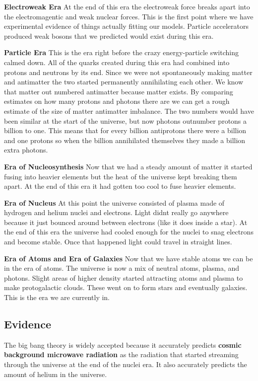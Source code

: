 \textbf{Electroweak Era}
At the end of this era the electroweak force breaks apart into the electromagentic and weak nuclear forces. This is the first point where we have experimental evidence of things actually fitting our models. Particle accelerators produced weak bosons that we predicted would exist during this era.

\textbf{Particle Era}
This is the era right before the crazy energy-particle switching calmed down. All of the quarks created during this era had combined into protons and neutrons by its end. Since we were not spontaneously making matter and antimatter the two started permanently annihilating each other. We know that matter out numbered antimatter because matter exists. By comparing estimates on how many protons and photons there are we can get a rough estimate of the size of matter antimatter imbalance. The two numbers would have been similar at the start of the universe, but now photons outnumber protons a billion to one. This means that for every billion antiprotons there were a billion and one protons so when the billion annihilated themselves they made a billion extra photons.

\textbf{Era of Nucleosynthesis}
Now that we had a steady amount of matter it started fusing into heavier elements but the heat of the universe kept breaking them apart. At the end of this era it had gotten too cool to fuse heavier elements.

\textbf{Era of Nucleus}
At this point the universe consisted of plasma made of hydrogen and helium nuclei and electrons. Light didnt really go anywhere because it just bounced around between electrons (like it does inside a star). At the end of this era the universe had cooled enough for the nuclei to snag electrons and become stable. Once that happened light could travel in straight lines.

\textbf{Era of Atoms and Era of Galaxies}
Now that we have stable atoms we can be in the era of atoms. The universe is now a mix of neutral atoms, plasma, and photons. Slight areas of higher density started attracting atoms and plasma to make protogalactic clouds. These went on to form stars and eventually galaxies. This is the era we are currently in.

\subsection{Evidence}
The big bang theory is widely accepted because it accurately predicts \textbf{cosmic background microwave radiation} as the radiation that started streaming through the universe at the end of the nuclei era. It also accurately predicts the amount of helium in the universe.

